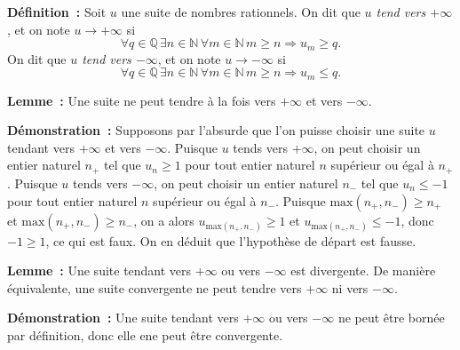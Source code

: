 \medskip

\noindent\textbf{Définition :} Soit $u$ une suite de nombres rationnels. 
    On dit que \emph{$u$ tend vers $+\infty$}, et on note $u \rightarrow + \infty$ si
    \begin{equation*}
        \forall q \in \mathbb{Q} \, 
        \exists n \in \mathbb{N} \, 
        \forall m \in \mathbb{N} \, 
        m \geq n \Rightarrow
            u_m \geq q.
    \end{equation*}
    On dit que \emph{$u$ tend vers $-\infty$}, et on note $u \rightarrow - \infty$ si
    \begin{equation*}
        \forall q \in \mathbb{Q} \, 
        \exists n \in \mathbb{N} \, 
        \forall m \in \mathbb{N} \, 
        m \geq n \Rightarrow
            u_m \leq q.
    \end{equation*}

\medskip

\noindent\textbf{Lemme :} Une suite ne peut tendre à la fois vers $+\infty$ et vers $-\infty$. 

\medskip

\noindent\textbf{Démonstration :} Supposons par l'absurde que l'on puisse choisir une suite $u$ tendant vers $+\infty$ et vers $-\infty$.
    Puisque $u$ tends vers $+\infty$, on peut choisir un entier naturel $n_+$ tel que $u_n \geq 1$ pour tout entier naturel $n$ supérieur ou égal à $n_+$.
    Puisque $u$ tends vers $-\infty$, on peut choisir un entier naturel $n_-$ tel que $u_n \leq -1$ pour tout entier naturel $n$ supérieur ou égal à $n_-$.
    Puisque $\mathrm{max}(n_+, n_-) \geq n_+$ et  $\mathrm{max}(n_+, n_-) \geq n_-$, on a alors $u_{ \mathrm{max}(n_+, n_-) } \geq 1$ et $u_{ \mathrm{max}(n_+, n_-) } \leq -1$, donc $-1 \geq 1$, ce qui est faux.
    On en déduit que l'hypothèse de départ est fausse.

    \done

\medskip

\noindent\textbf{Lemme :} Une suite tendant vers $+\infty$ ou vers $-\infty$ est divergente. 
    De manière équivalente, une suite convergente ne peut tendre vers $+\infty$ ni vers $-\infty$.

\medskip

\noindent\textbf{Démonstration :} Une suite tendant vers $+\infty$ ou vers $-\infty$ ne peut être bornée par définition, donc elle ene peut être convergente.

\done

\medskip

